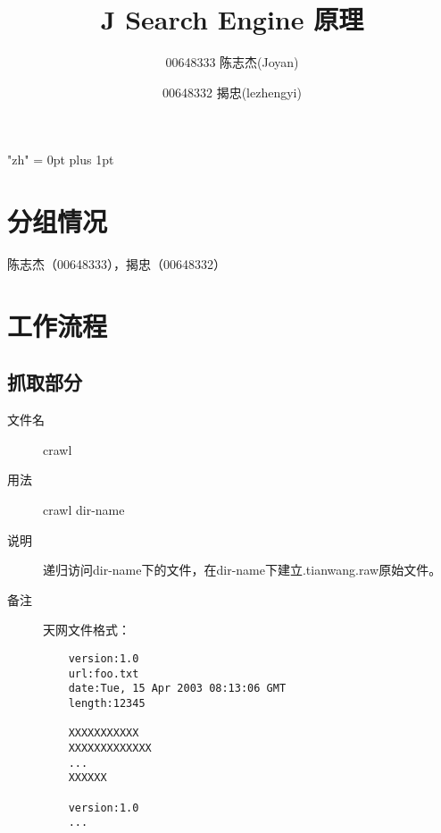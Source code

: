 \documentclass[14pt,a4paper]{article}
\title{J Search Engine 原理}
\author{00648333 陈志杰(Joyan) \and 00648332 揭忠(lezhengyi)}
\begin{document}
\XeTeXlinebreaklocale "zh"
\XeTeXlinebreakskip = 0pt plus 1pt

\maketitle        
\section{分组情况}
陈志杰（00648333），揭忠（00648332）
\section{工作流程}
\subsection{抓取部分}
\begin{description}
\item[文件名] crawl
\item[用法] crawl dir-name
\item[说明] 递归访问dir-name下的文件，在dir-name下建立.tianwang.raw原始文件。
\item[备注] 天网文件格式：\\
  \begin{lstlisting}
    version:1.0
    url:foo.txt
    date:Tue, 15 Apr 2003 08:13:06 GMT
    length:12345

    XXXXXXXXXXX
    XXXXXXXXXXXXX
    ...
    XXXXXX

    version:1.0
    ...
  \end{lstlisting}
\end{description}
\end{document}
